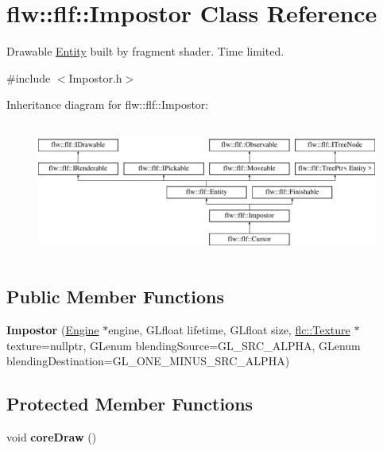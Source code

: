 \hypertarget{classflw_1_1flf_1_1Impostor}{}\section{flw\+:\+:flf\+:\+:Impostor Class Reference}
\label{classflw_1_1flf_1_1Impostor}


Drawable \hyperlink{classflw_1_1flf_1_1Entity}{Entity} built by fragment shader. Time limited.  




{\ttfamily \#include $<$Impostor.\+h$>$}

Inheritance diagram for flw\+:\+:flf\+:\+:Impostor\+:\begin{figure}[H]
\begin{center}
\leavevmode
\includegraphics[height=4.487180cm]{classflw_1_1flf_1_1Impostor}
\end{center}
\end{figure}
\subsection*{Public Member Functions}
\begin{DoxyCompactItemize}
\item 
\mbox{\label{classflw_1_1flf_1_1Impostor_a8e3518ed91a20cc188b1a216add6154f}} 
{\bfseries Impostor} (\hyperlink{classflw_1_1Engine}{Engine} $\ast$engine, G\+Lfloat lifetime, G\+Lfloat size, \hyperlink{classflw_1_1flc_1_1Texture}{flc\+::\+Texture} $\ast$texture=nullptr, G\+Lenum blending\+Source=G\+L\+\_\+\+S\+R\+C\+\_\+\+A\+L\+P\+HA, G\+Lenum blending\+Destination=G\+L\+\_\+\+O\+N\+E\+\_\+\+M\+I\+N\+U\+S\+\_\+\+S\+R\+C\+\_\+\+A\+L\+P\+HA)
\end{DoxyCompactItemize}
\subsection*{Protected Member Functions}
\begin{DoxyCompactItemize}
\item 
\mbox{\label{classflw_1_1flf_1_1Impostor_a29d7972ad45278d2c45f55d28206a0b3}} 
void {\bfseries core\+Draw} ()
\end{DoxyCompactItemize}
